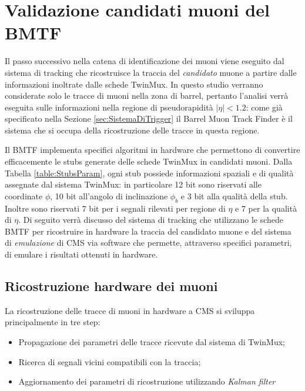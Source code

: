 \section{Validazione candidati muoni del BMTF}
\label{sec:BMTF}

Il passo successivo nella catena di identificazione dei muoni viene eseguito dal sistema di tracking che ricostruisce la traccia del \textit{candidato} muone a partire dalle informazioni inoltrate dalle schede TwinMux. In questo studio verranno considerate solo le tracce di muoni nella zona di barrel, pertanto l'analisi verrà eseguita sulle informazioni nella regione di pseudorapidità $|\eta| < 1.2$: come già specificato nella Sezione \ref{sec:SistemaDiTrigger} il Barrel Muon Track Finder è il sistema che si occupa della ricostruzione delle tracce in questa regione.

Il BMTF implementa specifici algoritmi in hardware che permettono di convertire efficacemente le stubs generate delle schede TwinMux in candidati muoni. Dalla Tabella \ref{table:StubsParam}, ogni stub possiede informazioni spaziali e di qualità assegnate dal sistema TwinMux: in particolare 12 bit sono riservati alle coordinate $\phi$, 10 bit all'angolo di inclinazione $\phi_b$ e 3 bit alla qualità della stub. Inoltre sono riservati 7 bit per i segnali rilevati per regione di $\eta$ e 7 per la qualità di $\eta$. Di seguito verrà discusso del sistema di tracking che utilizzano le schede BMTF per ricostruire in hardware la traccia del candidato muone e del sistema di \textit{emulazione} di CMS via software che permette, attraverso specifici parametri, di emulare i risultati ottenuti in hardware.

\subsection{Ricostruzione hardware dei muoni}
\label{sec:KalmannFilter}

La ricostruzione delle tracce di muoni in hardware a CMS si sviluppa principalmente in tre step: 
\begin{itemize}
  \item Propagazione dei parametri delle tracce ricevute dal sistema di TwinMux;
  \item Ricerca di segnali vicini compatibili con la traccia;
  \item Aggiornamento dei parametri di ricostruzione utilizzando \textit{Kalman filter} \cite{Summers:2728522}
\end{itemize}

